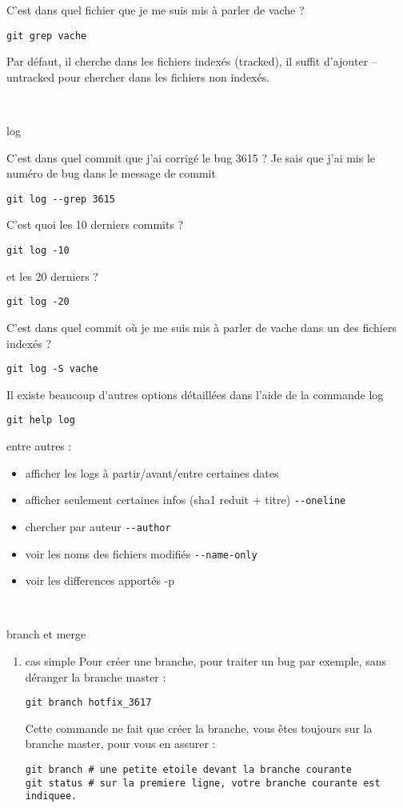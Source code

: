 \documentclass[10pt]{exam}
\begin{document}
\begin{questions}
C'est dans quel fichier que je me suis mis à parler de vache ?
\begin{lstlisting}
git grep vache
\end{lstlisting}
Par défaut, il cherche dans les fichiers indexés (tracked), il suffit d'ajouter --untracked pour chercher dans les fichiers non indexés.

~

\question log

C'est dans quel commit que j'ai corrigé le bug 3615 ? Je sais que j'ai mis le numéro de bug dans le message de commit
\begin{lstlisting}
git log --grep 3615
\end{lstlisting}

C'est quoi les 10 derniers commits ?
\begin{lstlisting}
git log -10
\end{lstlisting}
et les 20 derniers ?
\begin{lstlisting}
git log -20
\end{lstlisting}

C'est dans quel commit où je me suis mis à parler de vache dans un des fichiers indexés ?
\begin{lstlisting}
git log -S vache
\end{lstlisting}

Il existe beaucoup d'autres options détaillées dans l'aide de la commande log
\begin{lstlisting}
git help log
\end{lstlisting}
entre autres :
\begin{itemize}
\item afficher les logs à partir/avant/entre certaines dates
\item afficher seulement certaines infos (sha1 reduit + titre) \texttt{-{}-oneline}
\item chercher par auteur \texttt{-{}-author}
\item voir les noms des fichiers modifiés \texttt{-{}-name-only}
\item voir les differences apportés -p
\end{itemize}

~

\question branch et merge
\begin{enumerate}
\item cas simple
Pour créer une branche, pour traiter un bug par exemple, sans déranger la branche master :
\begin{lstlisting}
git branch hotfix_3617
\end{lstlisting}
Cette commande ne fait que créer la branche, vous êtes toujours sur la branche master, pour vous en assurer :
\begin{lstlisting}
git branch # une petite etoile devant la branche courante
git status # sur la premiere ligne, votre branche courante est indiquee.
\end{lstlisting}


\end{enumerate}
\end{questions}
\end{document}
